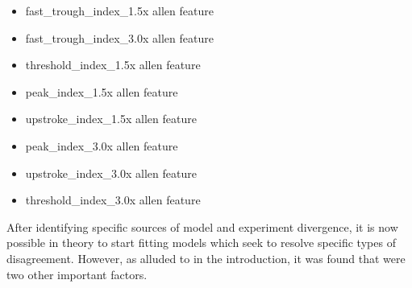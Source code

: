 \begin{itemize}

    \item fast\_trough\_index\_1.5x allen feature
    \item fast\_trough\_index\_3.0x allen feature
    \item threshold\_index\_1.5x allen feature
    \item peak\_index\_1.5x allen feature
    \item upstroke\_index\_1.5x allen feature
    \item peak\_index\_3.0x allen feature
    \item upstroke\_index\_3.0x allen feature
    \item threshold\_index\_3.0x allen feature
\end{itemize}

After identifying specific sources of model and experiment divergence, it is now possible in theory to start fitting models which  seek to resolve specific types of disagreement. However, as alluded to in the introduction, it was found that were two other important factors. 







